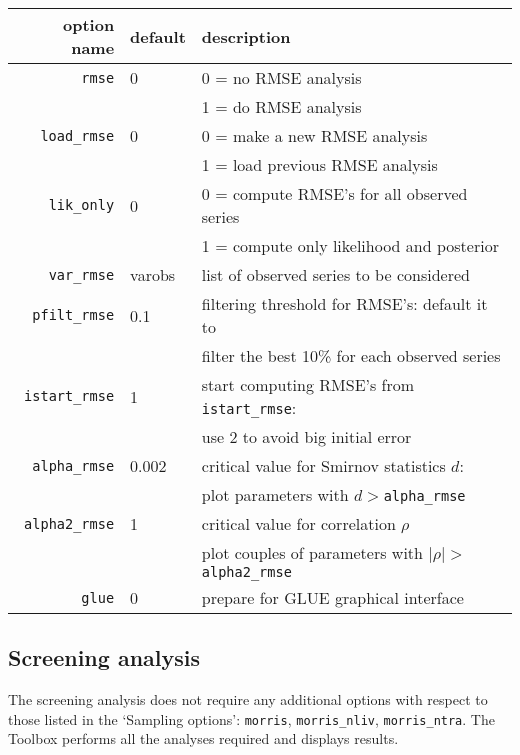 \documentclass[12pt,a4paper]{article}
\begin{document}
\begin{tabular}{r|l|l}
                 option name & default & description  \\ \hline
                \verb"rmse"& 0& 0 = no RMSE analysis\\
                           &  & 1 = do RMSE analysis \\
            \verb"load_rmse"& 0& 0 = make a new RMSE analysis\\
                            &  & 1 = load previous RMSE analysis \\
             \verb"lik_only"& 0& 0 = compute RMSE's for all observed series\\
                            &  & 1 = compute only likelihood and posterior \\
             \verb"var_rmse"& varobs& list of observed series to be considered\\
           \verb"pfilt_rmse"& 0.1& filtering threshold for RMSE's: default it to\\
                            &    & filter the best 10\% for each observed series\\
          \verb"istart_rmse"& 1& start computing RMSE's from \verb"istart_rmse":\\
                            &  & use 2 to avoid big initial error \\
           \verb"alpha_rmse"& 0.002& critical value for Smirnov statistics $d$:\\
                            &   & plot parameters with $d>$\verb"alpha_rmse"\\
          \verb"alpha2_rmse"& 1& critical value for correlation $\rho$\\
                            &  & plot couples of parameters with
                            $|\rho|>$\verb"alpha2_rmse"\\
                 \verb"glue"& 0& prepare for GLUE graphical interface\\\hline
\end{tabular}

\subsection{Screening analysis}
The screening analysis does not require any additional options
with respect to those listed in the `Sampling options':
\verb"morris", \verb"morris_nliv", \verb"morris_ntra". The Toolbox
performs all the analyses required and displays results.
\end{document}
